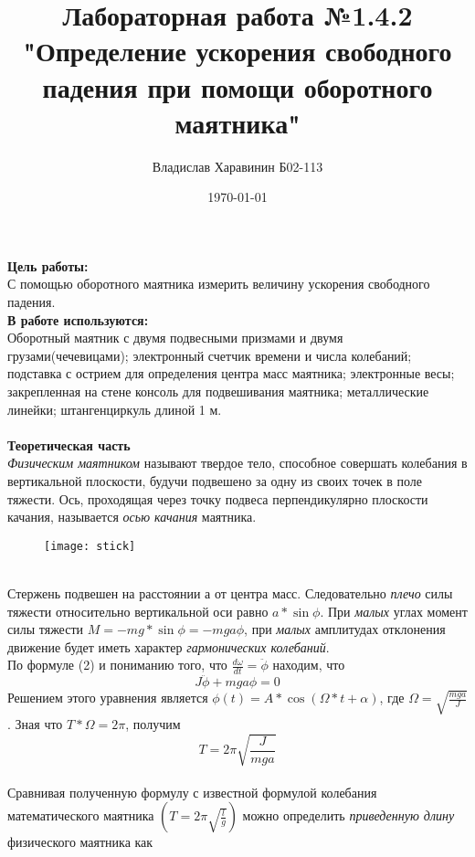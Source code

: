 \documentclass[a4paper, 12pt]{article}
\author{Владислав Харавинин Б02-113}
\title{Лабораторная работа №1.4.2 "Определение ускорения свободного падения при помощи  оборотного маятника" }
\date{\today}
\begin{document}
	
	\maketitle


	\textbf{Цель работы:}\\
С помощью оборотного маятника измерить величину ускорения свободного падения.\\

\textbf{В работе используются:}\\
Оборотный маятник с двумя подвесными призмами и двумя грузами(чечевицами); электронный счетчик времени и числа колебаний; подставка с острием для определения центра масс маятника; электронные весы; закрепленная на стене консоль для подвешивания маятника; металлические линейки; штангенциркуль длиной 1 м.\\\\
\textbf{Теоретическая часть}\\
\textit{Физическим маятником} называют твердое тело, способное совершать колебания в вертикальной плоскости, будучи подвешено за одну из своих точек в поле тяжести. Ось, проходящая через точку подвеса перпендикулярно плоскости качания, называется \textit{осью качания} маятника. \\
\begin{figure}[h]
	\centering
	\texttt{[image: stick]}
	\caption{}
\end{figure}\\
Стержень подвешен на расстоянии а от центра масс. Следовательно \textit{плечо} силы тяжести относительно вертикальной оси равно $a*\sin\phi$. При \textit{малых} углах момент силы тяжести $M = -mg*\sin\phi = -mga\phi $, при \textit{малых} амплитудах отклонения движение будет иметь характер \textit{гармонических колебаний}.\\
По формуле (2) и пониманию того, что $\frac{d\omega}{dt} = \ddot{\phi} $ находим, что
\begin{equation}
	J\ddot{\phi} + mga\phi = 0
\end{equation}
Решением этого уравнения является $\phi(t)=A*\cos(\Omega*t+\alpha)$, где $\Omega=\sqrt{\frac{mga}{J}}$. Зная что $T*\Omega=2\pi$, получим 
\begin{equation}
	T=2\pi\sqrt{\frac{J}{mga}}
\end{equation}\\
Сравнивая полученную формулу с известной формулой колебания математического маятника  $(T = 2\pi\sqrt{\frac{l}{g}})$ можно определить \textit{приведенную длину} физического маятника как
\end{document}
